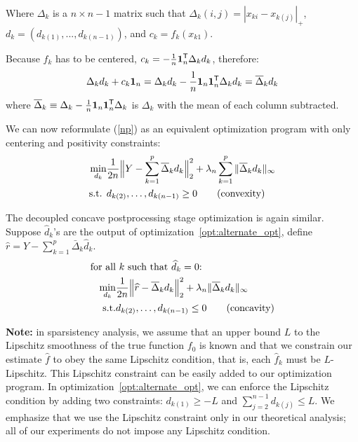 Where $\Delta_k$ is a $n\times n-1$ matrix such that $\Delta_k(i,j) = |x_{ki} - x_{k(j)}|_+$, $d_k = (d_{k(1)} ,..., d_{k(n-1)})$, and $c_k = f_k(x_{k1})$. 

Because $f_k$ has to be centered, $c_k = - \frac{1}{n} \mbox{\boldmath $1$}_n^{\mathsf{T}} \Delta_k d_k$, therefore:
\[
\Delta_k d_k + c_k \mbox{\boldmath $1$}_n = 
   \Delta_k d_k - \frac{1}{n} \mbox{\boldmath $1$}_n \mbox{\boldmath $1$}_n^{\mathsf{T}} \Delta_k d_k = 
   \overline{\Delta}_k d_k 
\]
where $\overline{\Delta}_k \equiv \Delta_k - \frac{1}{n} \mbox{\boldmath $1$}_n \mbox{\boldmath $1$}_n^{\mathsf{T}} \Delta_k$ is $\Delta_k$ with the mean of each column subtracted.

We can now reformulate (\ref{np}) as an equivalent optimization program with only centering and positivity constraints:
\begin{align}
\min_{d_k}& \frac{1}{2n} 
       \Bigl\| Y - \sum_{k=1}^p 
              \overline{\Delta}_k d_k \Bigr\|_2^2 
               + \lambda_n \sum_{k=1}^p \|\overline{\Delta}_k d_k \|_\infty   
     \label{opt:alternate_opt} \\
\textrm{s.t. }  & d_{k(2)}, \ldots , d_{k(n-1)} \geq 0  	
               \qquad \textrm{(convexity)} \nonumber 
\end{align}

The decoupled concave postprocessing stage optimization is again similar. Suppose $\hat{d}_k$'s are the output of optimization~\ref{opt:alternate_opt}, define $\hat{r} = Y - \sum_{k=1}^p \bar{\Delta}_k \hat{d}_k$. 
\begin{align}
\textrm{for all}&\textrm{ $k$ such that $\widehat{d}_k = 0$: }  \nonumber \\
  \min_{d_k} & 
      \frac{1}{2n} \Bigl \| \widehat{r} - \overline{\Delta}_k d_k \Bigr \|_2^2
      + \lambda_n \| \overline{\Delta}_k d_k \|_\infty 
      \label{opt:alternate_opt_concave}\\
 \textrm{s.t.} & d_{k(2)}, \ldots, d_{k(n-1)} \leq 0 \qquad \textrm{(concavity)} \nonumber
\end{align}

\textbf{Note:} in sparsistency analysis, we assume that an upper bound $L$ to the Lipschitz smoothness of the true function $f_0$ is known and that we constrain our estimate $\hat{f}$ to obey the same Lipschitz condition, that is, each $\hat{f}_k$ must be $L$-Lipschitz. This Lipschitz constraint can be easily added to our optimization program. In optimization~\ref{opt:alternate_opt}, we can enforce the Lipschitz condition by adding two constraints: $d_{k(1)} \geq - L$ and $\sum_{j=2}^{n-1} d_{k(j)} \leq L$. We emphasize that we use the Lipschitz constraint only in our theoretical analysis; all of our experiments do not impose any Lipschitz condition.




